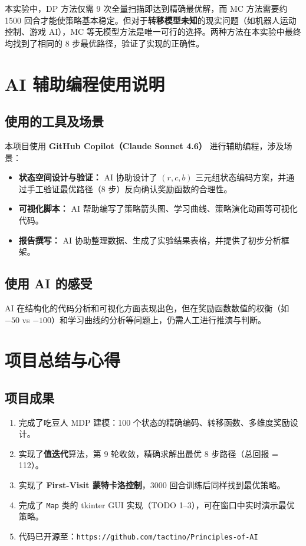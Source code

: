 \documentclass[12pt,a4paper]{ctexart}
\begin{document}
本实验中，DP 方法仅需 9 次全量扫描即达到精确最优解，而 MC 方法需要约 1500 回合才能使策略基本稳定。但对于\textbf{转移模型未知}的现实问题（如机器人运动控制、游戏 AI），MC 等无模型方法是唯一可行的选择。两种方法在本实验中最终均找到了相同的 8 步最优路径，验证了实现的正确性。

\section{AI 辅助编程使用说明}

\subsection{使用的工具及场景}
本项目使用 \textbf{GitHub Copilot（Claude Sonnet 4.6）} 进行辅助编程，涉及场景：
\begin{itemize}
    \item \textbf{状态空间设计与验证：} AI 协助设计了 $(r, c, b)$ 三元组状态编码方案，并通过手工验证最优路径（8 步）反向确认奖励函数的合理性。
    \item \textbf{可视化脚本：} AI 帮助编写了策略箭头图、学习曲线、策略演化动画等可视化代码。
    \item \textbf{报告撰写：} AI 协助整理数据、生成了实验结果表格，并提供了初步分析框架。
\end{itemize}

\subsection{使用 AI 的感受}
AI 在结构化的代码分析和可视化方面表现出色，但在奖励函数数值的权衡（如 $-50$ vs $-100$）和学习曲线的分析等问题上，仍需人工进行推演与判断。

\section{项目总结与心得}

\subsection{项目成果}
\begin{enumerate}
    \item 完成了吃豆人 MDP 建模：100 个状态的精确编码、转移函数、多维度奖励设计。
    \item 实现了\textbf{值迭代}算法，第 9 轮收敛，精确求解出最优 8 步路径（总回报 = 112）。
    \item 实现了 \textbf{First-Visit 蒙特卡洛控制}，3000 回合训练后同样找到最优策略。
    \item 完成了 \texttt{Map} 类的 tkinter GUI 实现（TODO 1--3），可在窗口中实时演示最优策略。
    \item 代码已开源至：\texttt{https://github.com/tactino/Principles-of-AI}
\end{enumerate}
\end{document}
